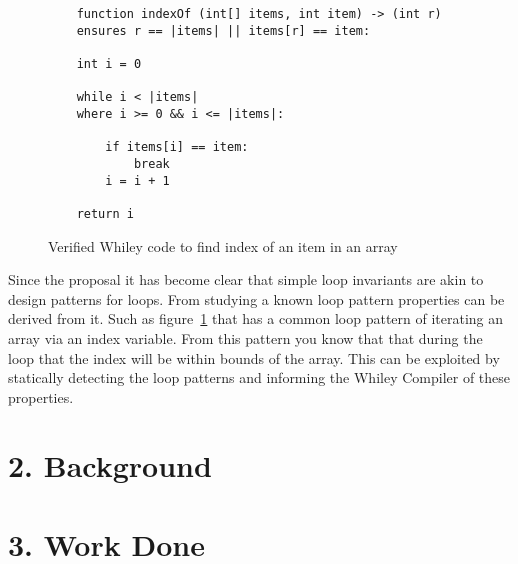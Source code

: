\documentclass[11pt, a4paper, twoside, openright]{report}
\begin{document}
\begin{figure}[h]
\begin{lstlisting}
    function indexOf (int[] items, int item) -> (int r)
    ensures r == |items| || items[r] == item:

    int i = 0

    while i < |items|
    where i >= 0 && i <= |items|:

        if items[i] == item:
            break
        i = i + 1

    return i
\end{lstlisting}
\caption{Verified Whiley code to find index of an item in an array}
\label{lst:whiley-ex-1}
\end{figure}

Since the proposal it has become clear that simple loop invariants are
akin to design patterns for loops.
From studying a known loop pattern properties can be derived from it.
Such as figure~\ref{lst:whiley-ex-1} that has a common loop pattern of
iterating an array via an index variable.
From this pattern you know that that during the loop that the index will be
within bounds of the array.
This can be exploited by statically detecting the loop patterns and informing
the Whiley Compiler of these properties.

\section*{2. Background}


\cite{whiley-origin} \cite{whiley-design}
\cite{dafny-started}




\section*{3. Work Done}
\end{document}
